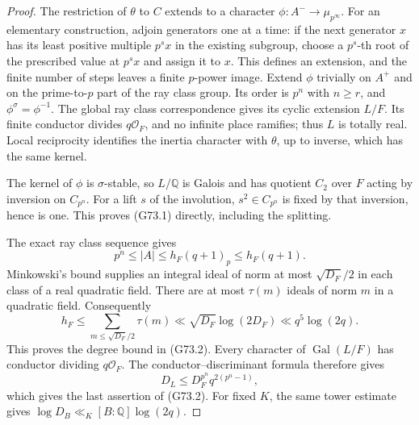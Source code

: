\begin{proof}
The restriction of $\theta$ to $C$ extends to a character
$\phi:A^-\to\mu_{p^\infty}$.
For an elementary construction, adjoin generators one at a time:
if the next generator $x$ has its least positive multiple
$p^s x$ in the existing subgroup, choose a $p^s$-th root
of the prescribed value at $p^s x$ and assign it to $x$.
This defines an extension, and the finite number of
steps leaves a finite $p$-power image.
Extend $\phi$ trivially on $A^+$ and on the prime-to-$p$
part of the ray class group. Its order is $p^n$ with $n\ge r$,
and $\phi^\sigma=\phi^{-1}$.
The global ray class correspondence gives its cyclic
extension $L/F$. Its finite conductor divides $q\mathcal O_F$,
and no infinite place ramifies; thus $L$ is totally real.
Local reciprocity identifies the inertia character with
$\theta$, up to inverse, which has the same kernel.

The kernel of $\phi$ is $\sigma$-stable, so $L/\mathbb Q$
is Galois and has quotient $C_2$ over $F$ acting by inversion
on $C_{p^n}$. For a lift $s$ of the involution,
$s^2\in C_{p^n}$ is fixed by that inversion, hence is one.
This proves (G73.1) directly, including the splitting.

The exact ray class sequence gives
\[
 p^n\le |A|\le h_F(q+1)_p\le h_F(q+1).              \tag{G73.7}
\]
Minkowski's bound supplies an integral ideal of norm at
most $\sqrt{D_F}/2$ in each class of a real quadratic field.
There are at most $\tau(m)$ ideals of norm $m$ in a quadratic
field. Consequently
\[
 h_F\le\sum_{m\le\sqrt{D_F}/2}\tau(m)
       \ll\sqrt{D_F}\log(2D_F)\ll q^5\log(2q).
                                                        \tag{G73.8}
\]
This proves the degree bound in (G73.2).
Every character of $\operatorname{Gal}(L/F)$ has conductor
dividing $q\mathcal O_F$. The conductor--discriminant formula
therefore gives
\[
 D_L\le D_F^{p^n}q^{2(p^n-1)},                       \tag{G73.9}
\]
which gives the last assertion of (G73.2).
For fixed $K$, the same tower estimate gives
$\log D_B\ll_K[B:\mathbb Q]\log(2q)$.


\end{proof}
